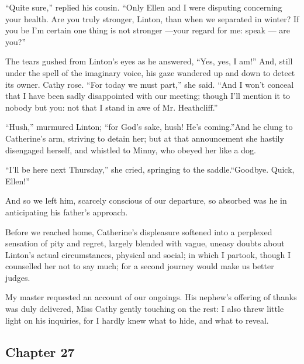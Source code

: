 \par “Quite sure,” replied his cousin. “Only Ellen and I were disputing concerning your health. Are you truly stronger, Linton, than when we separated in winter? If you be I'm certain one thing is not stronger —your regard for me: speak — are you?”
\par The tears gushed from Linton's eyes as he answered, “Yes, yes, I am!” And, still under the spell of the imaginary voice, his gaze wandered up and down to detect its owner. Cathy rose. “For today we must part,” she said. “And I won't conceal that I have been sadly disappointed with our meeting; though I'll mention it to nobody but you: not that I stand in awe of Mr. Heathcliff.”
\par “Hush,” murmured Linton; “for God's sake, hush! He's coming.”And he clung to Catherine's arm, striving to detain her; but at that announcement she hastily disengaged herself, and whistled to Minny, who obeyed her like a dog.
\par “I'll be here next Thursday,” she cried, springing to the saddle.“Goodbye. Quick, Ellen!”
\par And so we left him, scarcely conscious of our departure, so absorbed was he in anticipating his father's approach.
\par Before we reached home, Catherine's displeasure softened into a perplexed sensation of pity and regret, largely blended with vague, uneasy doubts about Linton's actual circumstances, physical and social; in which I partook, though I counselled her not to say much; for a second journey would make us better judges.
\par My master requested an account of our ongoings. His nephew's offering of thanks was duly delivered, Miss Cathy gently touching on the rest: I also threw little light on his inquiries, for I hardly knew what to hide, and what to reveal.


\subsection*{Chapter 27}


